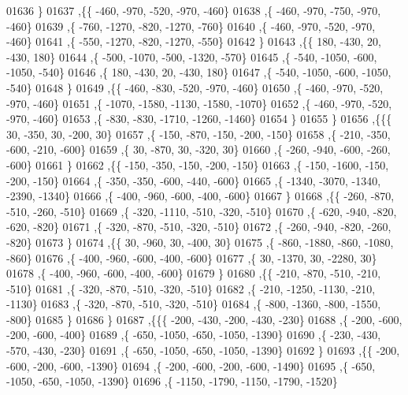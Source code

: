 \begin{DoxyCode}
01636     \}
01637    ,\{\{  -460,  -970,  -520,  -970,  -460\}
01638     ,\{  -460,  -970,  -750,  -970,  -460\}
01639     ,\{  -760, -1270,  -820, -1270,  -760\}
01640     ,\{  -460,  -970,  -520,  -970,  -460\}
01641     ,\{  -550, -1270,  -820, -1270,  -550\}
01642     \}
01643    ,\{\{   180,  -430,    20,  -430,   180\}
01644     ,\{  -500, -1070,  -500, -1320,  -570\}
01645     ,\{  -540, -1050,  -600, -1050,  -540\}
01646     ,\{   180,  -430,    20,  -430,   180\}
01647     ,\{  -540, -1050,  -600, -1050,  -540\}
01648     \}
01649    ,\{\{  -460,  -830,  -520,  -970,  -460\}
01650     ,\{  -460,  -970,  -520,  -970,  -460\}
01651     ,\{ -1070, -1580, -1130, -1580, -1070\}
01652     ,\{  -460,  -970,  -520,  -970,  -460\}
01653     ,\{  -830,  -830, -1710, -1260, -1460\}
01654     \}
01655    \}
01656   ,\{\{\{    30,  -350,    30,  -200,    30\}
01657     ,\{  -150,  -870,  -150,  -200,  -150\}
01658     ,\{  -210,  -350,  -600,  -210,  -600\}
01659     ,\{    30,  -870,    30,  -320,    30\}
01660     ,\{  -260,  -940,  -600,  -260,  -600\}
01661     \}
01662    ,\{\{  -150,  -350,  -150,  -200,  -150\}
01663     ,\{  -150, -1600,  -150,  -200,  -150\}
01664     ,\{  -350,  -350,  -600,  -440,  -600\}
01665     ,\{ -1340, -3070, -1340, -2390, -1340\}
01666     ,\{  -400,  -960,  -600,  -400,  -600\}
01667     \}
01668    ,\{\{  -260,  -870,  -510,  -260,  -510\}
01669     ,\{  -320, -1110,  -510,  -320,  -510\}
01670     ,\{  -620,  -940,  -820,  -620,  -820\}
01671     ,\{  -320,  -870,  -510,  -320,  -510\}
01672     ,\{  -260,  -940,  -820,  -260,  -820\}
01673     \}
01674    ,\{\{    30,  -960,    30,  -400,    30\}
01675     ,\{  -860, -1880,  -860, -1080,  -860\}
01676     ,\{  -400,  -960,  -600,  -400,  -600\}
01677     ,\{    30, -1370,    30, -2280,    30\}
01678     ,\{  -400,  -960,  -600,  -400,  -600\}
01679     \}
01680    ,\{\{  -210,  -870,  -510,  -210,  -510\}
01681     ,\{  -320,  -870,  -510,  -320,  -510\}
01682     ,\{  -210, -1250, -1130,  -210, -1130\}
01683     ,\{  -320,  -870,  -510,  -320,  -510\}
01684     ,\{  -800, -1360,  -800, -1550,  -800\}
01685     \}
01686    \}
01687   ,\{\{\{  -200,  -430,  -200,  -430,  -230\}
01688     ,\{  -200,  -600,  -200,  -600,  -400\}
01689     ,\{  -650, -1050,  -650, -1050, -1390\}
01690     ,\{  -230,  -430,  -570,  -430,  -230\}
01691     ,\{  -650, -1050,  -650, -1050, -1390\}
01692     \}
01693    ,\{\{  -200,  -600,  -200,  -600, -1390\}
01694     ,\{  -200,  -600,  -200,  -600, -1490\}
01695     ,\{  -650, -1050,  -650, -1050, -1390\}
01696     ,\{ -1150, -1790, -1150, -1790, -1520\}

\end{DoxyCode}
